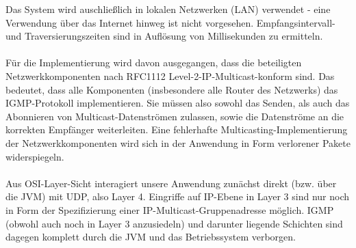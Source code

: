 Das System wird auschließlich in lokalen Netzwerken (LAN) verwendet - eine
Verwendung über das Internet hinweg ist nicht vorgesehen.
Empfangsintervall- und Traversierungszeiten sind in Auflösung von Millisekunden
zu ermitteln.\\
\\
Für die Implementierung wird davon ausgegangen, dass die
beteiligten Netzwerkkomponenten nach RFC1112 Level-2-IP-Multicast-konform sind.
Das bedeutet, dass alle Komponenten (insbesondere alle Router des Netzwerks) das
IGMP-Protokoll implementieren. Sie müssen also sowohl das Senden, als auch das
Abonnieren von Multicast-Datenströmen zulassen, sowie die Datenströme an die
korrekten Empfänger weiterleiten. Eine fehlerhafte Multicasting-Implementierung
der Netzwerkkomponenten wird sich in der Anwendung in Form verlorener Pakete
widerspiegeln.\\
\\
Aus OSI-Layer-Sicht interagiert unsere Anwendung zunächst direkt
(bzw. über die JVM) mit UDP, also Layer 4. Eingriffe auf IP-Ebene in Layer 3 sind nur
noch in Form der Spezifizierung einer IP-Multicast-Gruppenadresse möglich. IGMP
(obwohl auch noch in Layer 3 anzusiedeln) und darunter liegende Schichten sind
dagegen komplett durch die JVM und das Betriebssystem verborgen.
